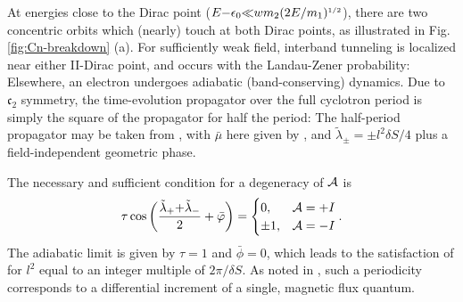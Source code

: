 \documentclass[aps, prb, showpacs, twocolumn, notitlepage, superscriptaddress]{revtex4-1}
\begin{document}
At energies close to the Dirac point ($E{-}\epsilon_0 {\ll} wm_2(2E/m_1)^{\scriptscriptstyle{1/2}}$), there are two concentric orbits which (nearly) touch at both Dirac points, as illustrated in Fig. \ref{fig:Cn-breakdown} (a). For sufficiently weak field, interband tunneling is localized near either II-Dirac point, and occurs with the Landau-Zener probability:
Elsewhere, an electron undergoes adiabatic (band-conserving) dynamics. Due to $\mathfrak{c}_2$ symmetry, the time-evolution propagator over the full cyclotron period is simply the square of the propagator for half the period: 
The half-period propagator may be taken from , with  $\bar{\mu}$ here given by , and  $\tilde{\lambda}_{\pm}{=}{\pm}l^2\delta S/4$ plus a field-independent geometric phase.
 






The necessary and sufficient condition for a degeneracy of ${\cal A}$ is \begin{align}\tau\cos\bigg(\f{\tilde{\lambda}_+{+}\tilde{\lambda}_-}{2}+\bar{\varphi}\bigg)= \begin{cases} 0, & {\A}=+I \\
                 \pm 1, & \A =-I\end{cases}.\la{c2breakdowndgncondition}
\end{align}
The adiabatic limit is given by $\tau{=}1$ and $\bar{\phi}{=}0$, which leads to the satisfaction of  for $l^2$ equal to an integer multiple of $2\pi/\delta S$. As noted  in , such a periodicity  corresponds to a differential increment of a single, magnetic flux quantum. 
\end{document}
